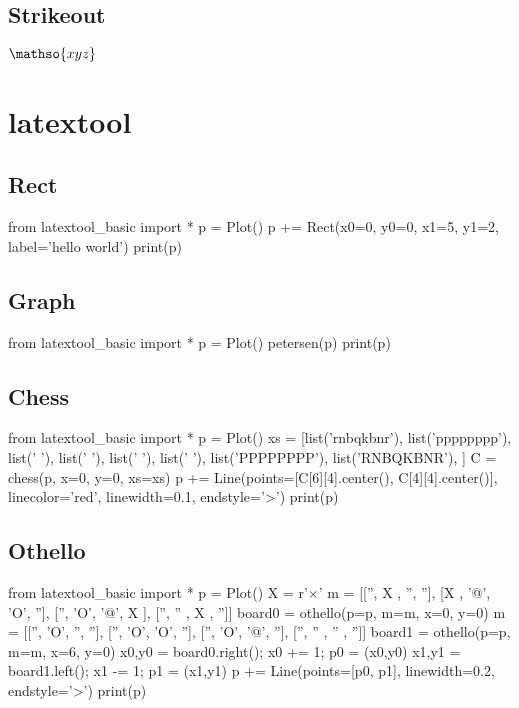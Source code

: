 \section{Strikeout}


$\mathso{xyz}$



\chapter{latextool}

\section{Rect}
\begin{python}
from latextool_basic import *
p = Plot()
p += Rect(x0=0, y0=0, x1=5, y1=2, label='hello world')
print(p)
\end{python}

\section{Graph}
\begin{python}
from latextool_basic import *
p = Plot()
petersen(p)
print(p)
\end{python}

\section{Chess}
\begin{python}
from latextool_basic import *
p = Plot()
xs = [list('rnbqkbnr'),
list('pppppppp'),
list('        '),
list('        '),
list('        '),
list('        '),
list('PPPPPPPP'),
list('RNBQKBNR'),
]
C = chess(p, x=0, y=0, xs=xs)
p += Line(points=[C[6][4].center(), C[4][4].center()], linecolor='red',
linewidth=0.1, endstyle='>')
print(p)
\end{python}



\section{Othello}
\begin{python}
from latextool_basic import *
p = Plot()
X = r'$\times$'
m = [['', X , '', ''],
[X , '@', 'O', ''],
['', 'O', '@', X ],
['', '' , X , '']]
board0 = othello(p=p, m=m, x=0, y=0)
m = [['', 'O', '', ''],
['', 'O', 'O', ''],
['', 'O', '@', ''],
['', '' , '' , '']]
board1 = othello(p=p, m=m, x=6, y=0)
x0,y0 = board0.right(); x0 += 1; p0 = (x0,y0)
x1,y1 = board1.left(); x1 -= 1; p1 = (x1,y1)
p += Line(points=[p0, p1], linewidth=0.2, endstyle='>')
print(p)
\end{python}

